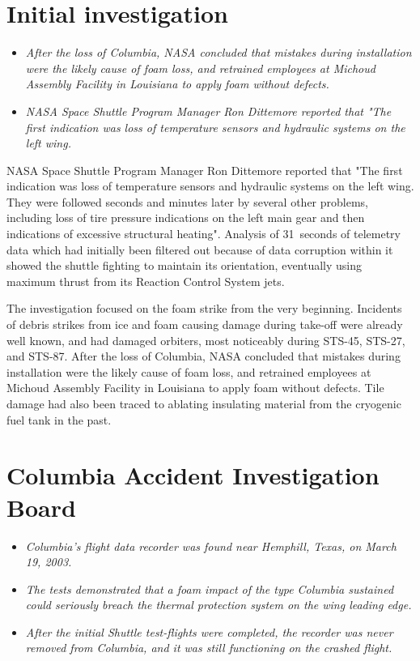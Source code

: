 \section{Initial investigation}\label{initial-investigation}

\begin{itemize}
\item
  \emph{After the loss of Columbia, NASA concluded that mistakes during
  installation were the likely cause of foam loss, and retrained
  employees at Michoud Assembly Facility in Louisiana to apply foam
  without defects.}
\item
  \emph{NASA Space Shuttle Program Manager Ron Dittemore reported that
  "The first indication was loss of temperature sensors and hydraulic
  systems on the left wing.}
\end{itemize}

NASA Space Shuttle Program Manager Ron Dittemore reported that "The
first indication was loss of temperature sensors and hydraulic systems
on the left wing. They were followed seconds and minutes later by
several other problems, including loss of tire pressure indications on
the left main gear and then indications of excessive structural
heating". Analysis of 31~seconds of telemetry data which had initially
been filtered out because of data corruption within it showed the
shuttle fighting to maintain its orientation, eventually using maximum
thrust from its Reaction Control System jets.

The investigation focused on the foam strike from the very beginning.
Incidents of debris strikes from ice and foam causing damage during
take-off were already well known, and had damaged orbiters, most
noticeably during STS-45, STS-27, and STS-87. After the loss of
Columbia, NASA concluded that mistakes during installation were the
likely cause of foam loss, and retrained employees at Michoud Assembly
Facility in Louisiana to apply foam without defects. Tile damage had
also been traced to ablating insulating material from the cryogenic fuel
tank in the past.

\section{Columbia Accident Investigation
Board}\label{columbia-accident-investigation-board}

\begin{itemize}
\item
  \emph{Columbia's flight data recorder was found near Hemphill, Texas,
  on March 19, 2003.}
\item
  \emph{The tests demonstrated that a foam impact of the type Columbia
  sustained could seriously breach the thermal protection system on the
  wing leading edge.}
\item
  \emph{After the initial Shuttle test-flights were completed, the
  recorder was never removed from Columbia, and it was still functioning
  on the crashed flight.}
\end{itemize}

